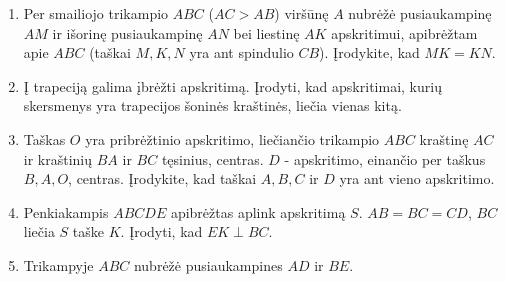 \begin{enumerate}
\item Per smailiojo trikampio $ABC$ ($AC>AB$) viršūnę $A$
  nubrėžė pusiaukampinę $AM$ ir išorinę pusiaukampinę $AN$
  bei liestinę $AK$ apskritimui, apibrėžtam apie $ABC$
  (taškai $M,K,N$ yra ant spindulio $CB$). Įrodykite, kad
  $MK=KN$. 
\item Į trapeciją galima įbrėžti apskritimą. Įrodyti, kad
  apskritimai, kurių skersmenys yra trapecijos šoninės
  kraštinės, liečia vienas kitą.
\item Taškas $O$ yra pribrėžtinio apskritimo, liečiančio
  trikampio $ABC$ kraštinę $AC$ ir kraštinių $BA$ ir $BC$
  tęsinius, centras. $D$ - apskritimo, einančio per taškus
  $B, A, O$, centras. Įrodykite, kad taškai $A, B, C$ ir $D$
  yra ant vieno apskritimo. 
\item Penkiakampis $ABCDE$ apibrėžtas aplink apskritimą $S$.
  $AB=BC=CD$, $BC$ liečia $S$ taške $K$. Įrodyti, kad
  $EK\perp BC$.
\item Trikampyje $ABC$ nubrėžė pusiaukampines $AD$ ir $BE$.

\end{enumerate}
